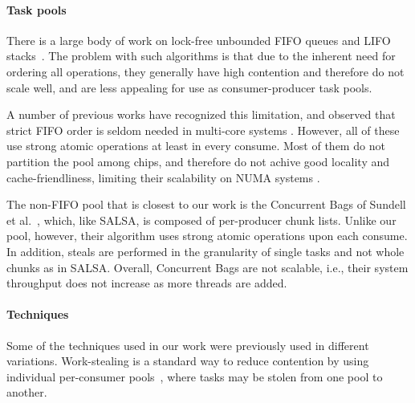 \paragraph{Task pools\\}
There is a large body of work on lock-free unbounded FIFO queues and LIFO
stacks~\cite{Gidenstam:2010:CLQ:1940234.1940266,Hendler:2004:SLS:1007912.1007944,
Hoffman:2007:BQ:1782394.1782423, Michael:1996:SFP:248052.248106,Moir:2005:UEI:1073970.1074013}.
The problem with such algorithms is that due to the inherent need for ordering all operations, they
generally have high contention and therefore do not scale well, and are less appealing for use as 
consumer-producer task pools. 

A number of previous works have recognized this limitation, and observed that strict FIFO
order is seldom needed in multi-core systems
\cite{Afek:2010:SPP:1885276.1885295,springerlink:10.1007/978-3-642-17653-1_29,
Basin:2011:CST:2075029.2075087,Sundell:2011:LAC:1989493.1989550}. However, all of these use strong
atomic operations at least in every consume. Most of them
\cite{Afek:2010:SPP:1885276.1885295,springerlink:10.1007/978-3-642-17653-1_29,
Basin:2011:CST:2075029.2075087} do not partition the pool among chips, and therefore do not achive
good locality and cache-friendliness, limiting their scalability on NUMA systems
\cite{Basin:Thesis:2011}.

The non-FIFO pool that is closest to our work is the Concurrent Bags of
Sundell et al.~\cite{Sundell:2011:LAC:1989493.1989550}, which, like SALSA, is composed of
per-producer chunk lists. Unlike our pool, however, their algorithm uses strong atomic operations
upon each consume. In addition, steals are performed in the granularity of single tasks and
not whole chunks as in SALSA. Overall, Concurrent Bags are not scalable, i.e., their system
throughput does not increase as more threads are added.

\paragraph{Techniques\\}
Some of the techniques used in our work were previously used in different
variations. Work-stealing is a standard way to reduce contention by using individual per-consumer
pools~\cite{Blumofe:1999:SMC:324133.324234}, where tasks may be stolen from one pool to another.


